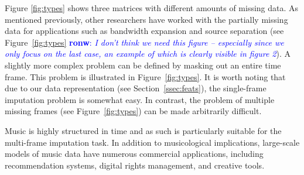 \documentclass{article}
\newcommand{\FIXME}[2][FIXME]{\textcolor{blue}{\textbf{#1}: \emph{#2}}}
\begin{document}

Figure \ref{fig:types} shows three matrices with different amounts of
missing data.  As mentioned previously, other researchers
\cite{Smaragdis2009} have worked with the partially missing data for
applications such as bandwidth expansion and source separation (see
Figure~\ref{fig:types} \FIXME[ronw]{I don't think we need this figure
  -- especially since we only focus on the last case, an example of
  which is clearly
  visible in figure 2}).  A slightly more complex problem can be
defined by masking out an entire time frame.  This problem is
illustrated in Figure~\ref{fig:types}.  It is worth noting that due to
our data representation (see Section~\ref{ssec:feats}), the
single-frame imputation problem is somewhat easy.  In contrast, the
problem of multiple missing frames (see Figure~\ref{fig:types}) can be
made arbitrarily difficult.

Music is highly structured in time and as such is particularly suitable
for the multi-frame imputation task.
In addition to musicological implications,
large-scale models of music data have numerous commercial
applications, including recommendation systems, digital rights
management, and creative tools.  
\end{document}
